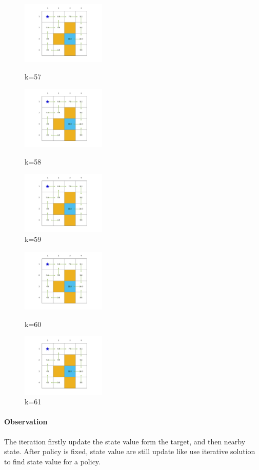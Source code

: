 \documentclass[UTF8]{ctexart}
\begin{document}
	\begin{figure}[H]
		\centering
		\begin{minipage}[t]{0.3\textwidth}
			\centering
			\includegraphics[width=4cm,height=3cm]{fig/PolicyAndState_56}
			\caption{k=57}
		\end{minipage}
		\begin{minipage}[t]{0.3\textwidth}
			\centering
			\includegraphics[width=4cm,height=3cm]{fig/PolicyAndState_57}
			\caption{k=58}
		\end{minipage}
		\begin{minipage}[t]{0.3\textwidth}
			\centering
			\includegraphics[width=4cm,height=3cm]{fig/PolicyAndState_58}
			\caption{k=59}
		\end{minipage}
	\end{figure}
	\begin{figure}[H]
		\centering
		\begin{minipage}[t]{0.45\textwidth}
			\centering
			\includegraphics[width=4cm,height=3cm]{fig/PolicyAndState_59}
			\caption{k=60}
		\end{minipage}
		\begin{minipage}[t]{0.45\textwidth}
			\centering
			\includegraphics[width=4cm,height=3cm]{fig/PolicyAndState_60}
			\caption{k=61}
		\end{minipage}
	\end{figure}
	\paragraph{Observation} The iteration firstly update the state value form the target, and then nearby state. After policy is fixed, state value are still update like use iterative solution to find state value for a policy.
\end{document}
